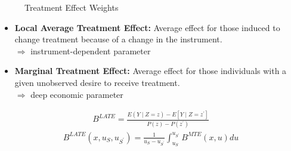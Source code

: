 \begin{frame}
\begin{figure}[htp]\centering
	\caption{Treatment Effect Weights}\label{Effects of Treatment as Weighted Averages}
\end{figure}
\end{frame}

   
\begin{frame}
\begin{itemize}
\item \textbf{Local Average Treatment Effect:} Average effect for those induced
to change treatment because of a change in the instrument. \\
\(\Rightarrow\) instrument-dependent parameter
\item \textbf{Marginal Treatment Effect:} Average effect for those individuals
with a given unobserved desire to receive treatment.\\
\(\Rightarrow\) deep economic parameter
\end{itemize}
\end{frame}


\begin{frame}
\begin{align*}
B^{LATE} = \frac{E(Y\mid Z = z) - E[Y \mid Z = z^\prime]}{P(z) - P(z^\prime)}
\end{align*}
\begin{align*}
B^{LATE}(x, u_S, u_{S^\prime}) = \frac{1}{u_S - u_{S^\prime}} \int_{u_S}^{u_{S^\prime}} B^{MTE}(x, u) du
\end{align*}
\end{frame} 
 
